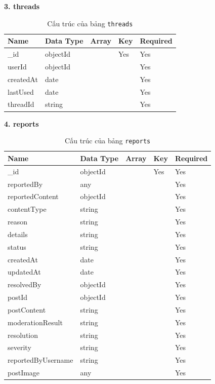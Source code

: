 \newpage
\textbf{3. threads}


\begin{table}[H]
\centering
\renewcommand{\arraystretch}{1.3}
\begin{tabular}{|p{4cm}|p{4cm}|p{2cm}|p{2cm}|p{2cm}|}
\hline
\textbf{Name} & \textbf{Data Type} & \textbf{Array} & \textbf{Key} & \textbf{Required} \\
\hline
\_id         & objectId &  & Yes & Yes \\
userId       & objectId &  &     & Yes \\
createdAt    & date     &  &     & Yes \\
lastUsed     & date     &  &     & Yes \\
threadId     & string   &  &     & Yes \\
\hline
\end{tabular}
\caption{Cấu trúc của bảng \texttt{threads}}
\end{table}

\newpage
\textbf{4. reports}

\begin{table}[H]
\centering
\renewcommand{\arraystretch}{1.3}
\begin{tabular}{|p{4cm}|p{4cm}|p{2cm}|p{2cm}|p{2cm}|}
\hline
\textbf{Name} & \textbf{Data Type} & \textbf{Array} & \textbf{Key} & \textbf{Required} \\
\hline
\_id               & objectId &  & Yes & Yes \\
reportedBy         & any      &  &     & Yes \\
reportedContent    & objectId &  &     & Yes \\
contentType        & string   &  &     & Yes \\
reason             & string   &  &     & Yes \\
details            & string   &  &     & Yes \\
status             & string   &  &     & Yes \\
createdAt          & date     &  &     & Yes \\
updatedAt          & date     &  &     & Yes \\
resolvedBy         & objectId &  &     & Yes \\
postId             & objectId &  &     & Yes \\
postContent        & string   &  &     & Yes \\
moderationResult   & string   &  &     & Yes \\
resolution         & string   &  &     & Yes \\
severity           & string   &  &     & Yes \\
reportedByUsername & string   &  &     & Yes \\
postImage          & any      &  &     & Yes \\
\hline
\end{tabular}
\caption{Cấu trúc của bảng \texttt{reports}}
\end{table}


